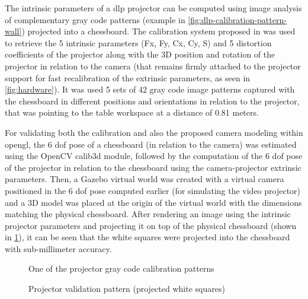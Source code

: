 The intrinsic parameters of a \gls{dlp} projector can be computed using image analysis of complementary gray code patterns (example in \cref{fig:dlp-calibration-pattern-wall}) projected into a chessboard. The calibration system proposed in \cite{Moreno2012} was used to retrieve the 5 intrinsic parameters (Fx, Fy, Cx, Cy, S) and 5 distortion coefficients of the projector along with the 3D position and rotation of the projector in relation to the camera (that remains firmly attached to the projector support for fast recalibration of the extrinsic parameters, as seen in \cref{fig:hardware}). It was used 5 sets of 42 gray code image patterns captured with the chessboard in different positions and orientations in relation to the projector, that was pointing to the table workspace at a distance of 0.81 meters.

For validating both the calibration and also the proposed camera modeling within \gls{opengl}, the 6 \gls{dof} pose of a chessboard (in relation to the camera) was estimated using the OpenCV calib3d module, followed by the computation of the 6 \gls{dof} pose of the projector in relation to the chessboard using the camera-projector extrinsic parameters. Then, a Gazebo virtual world was created with a virtual camera positioned in the 6 \gls{dof} pose computed earlier (for simulating the video projector) and a 3D model was placed at the origin of the virtual world with the dimensions matching the physical chessboard. After rendering an image using the intrinsic projector parameters and projecting it on top of the physical chessboard (shown in \cref{fig:dlp-projected-chessboard}), it can be seen that the white squares were projected into the chessboard with sub-millimeter accuracy.

\begin{figure}[H]
	\begin{floatrow}[2]
		{\caption{One of the projector gray code calibration patterns}\label{fig:dlp-calibration-pattern-wall}\vspace{-0.5em}}
		{\caption{Projector validation pattern (projected white squares)}\label{fig:dlp-projected-chessboard}\vspace{-0.5em}}
	\end{floatrow}
\end{figure}



